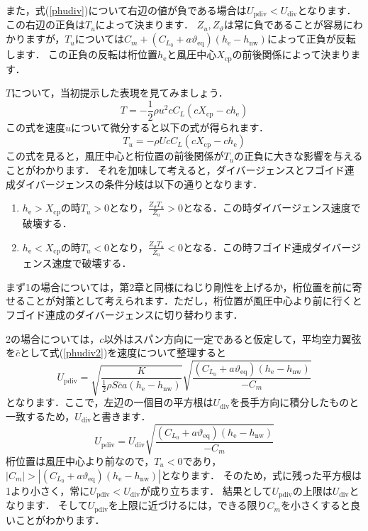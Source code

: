 \documentclass{jarticle}
\begin{document}
また，式(\ref{phudiv})について右辺の値が負である場合は$U_\mathrm{pdiv} < U_\mathrm{div}$となります．この右辺の正負は$T_u$によって決まります．
$Z_u,Z_\vartheta$は常に負であることが容易にわかりますが，$T_u$については$C_m +  (C_{L_0} + a\vartheta_\mathrm{eq})  (h_\mathrm{e}-h_\mathrm{nw})$によって正負が反転します．
この正負の反転は桁位置$h_\mathrm{e}$と風圧中心$X_\mathrm{cp}$の前後関係によって決まります．

$T$について，当初提示した表現を見てみましょう．
\begin{equation}
    T = -\frac{1}{2}\rho u^2 c C_L (cX_\mathrm{cp} - ch_\mathrm{e})
\end{equation}
この式を速度$u$について微分すると以下の式が得られます．
\begin{equation}
    T_u = -\rho U c C_L (cX_\mathrm{cp} - ch_\mathrm{e})
\end{equation}
この式を見ると，風圧中心と桁位置の前後関係が$T_u$の正負に大きな影響を与えることがわかります．
それを加味して考えると，ダイバージェンスとフゴイド連成ダイバージェンスの条件分岐は以下の通りとなります．
\begin{enumerate}
    \item $h_\mathrm{e} > X_\mathrm{cp}$の時$T_u>0$となり，$\frac{Z_\vartheta T_u}{Z_u} > 0$となる．この時ダイバージェンス速度で破壊する．
    \item $h_\mathrm{e} < X_\mathrm{cp}$の時$T_u<0$となり，$\frac{Z_\vartheta T_u}{Z_u} < 0$となる．この時フゴイド連成ダイバージェンス速度で破壊する．
\end{enumerate}

まず1の場合については，第2章と同様にねじり剛性を上げるか，桁位置を前に寄せることが対策として考えられます．ただし，桁位置が風圧中心より前に行くとフゴイド連成のダイバージェンスに切り替わります．

2の場合については，$c$以外はスパン方向に一定であると仮定して，平均空力翼弦を$\bar{c}$として式(\ref{phudiv2})を速度について整理すると
\begin{equation}
    U_\mathrm{pdiv} = \sqrt{ \frac{K}{\frac{1}{2}\rho S\bar{c}a(h_\mathrm{e}-h_\mathrm{nw})} } \sqrt{\frac{(C_{L_0}+a\vartheta_\mathrm{eq})(h_\mathrm{e}-h_\mathrm{nw})}{-C_m}}
\end{equation}
となります．ここで，左辺の一個目の平方根は$U_\mathrm{div}$を長手方向に積分したものと一致するため，$U_\mathrm{div}$と書きます．
\begin{equation} \label{pdiv}
    U_\mathrm{pdiv} = U_\mathrm{div} \sqrt{\frac{(C_{L_0}+a\vartheta_\mathrm{eq})(h_\mathrm{e}-h_\mathrm{nw})}{-C_m}}
\end{equation}
桁位置は風圧中心より前なので，$T_u<0$であり，$|C_m| >  |(C_{L_0} + a\vartheta_\mathrm{eq})  (h_\mathrm{e}-h_\mathrm{nw})|$となります．
そのため，式に残った平方根は1より小さく，常に$U_\mathrm{pdiv} < U_\mathrm{div}$が成り立ちます．
結果として$U_\mathrm{pdiv}$の上限は$U_\mathrm{div}$となります．
そして$U_\mathrm{pdiv}$を上限に近づけるには，できる限り$C_m$を小さくすると良いことがわかります．
\end{document}
